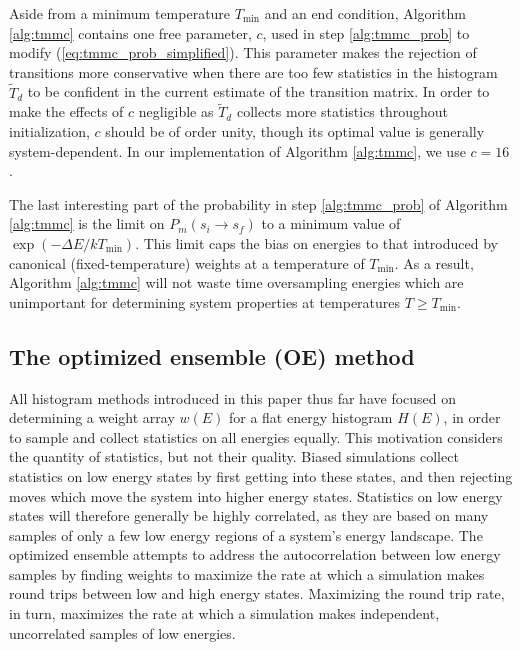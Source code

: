 \documentclass[11pt]{article}
\renewcommand{\t}{\text} %
\newcommand{\p}[1]{\left(#1\right)} %
\begin{document}
Aside from a minimum temperature $T_{\t{min}}$ and an end condition,
Algorithm \ref{alg:tmmc} contains one free parameter, $c$, used in
step \ref{alg:tmmc_prob} to modify (\ref{eq:tmmc_prob_simplified}).
This parameter makes the rejection of transitions more conservative
when there are too few statistics in the histogram $\tilde T_d$ to be
confident in the current estimate of the transition matrix. In order
to make the effects of $c$ negligible as $\tilde T_d$ collects more
statistics throughout initialization, $c$ should be of order unity,
though its optimal value is generally system-dependent. In our
implementation of Algorithm \ref{alg:tmmc}, we use $c=16$.

The last interesting part of the probability in step
\ref{alg:tmmc_prob} of Algorithm \ref{alg:tmmc} is the limit on
$P_m\p{s_i\to s_f}$ to a minimum value of $\exp\p{-\Delta
  E/kT_{\t{min}}}$. This limit caps the bias on energies to that
introduced by canonical (fixed-temperature) weights at a temperature
of $T_{\t{min}}$. As a result, Algorithm \ref{alg:tmmc} will not waste
time oversampling energies which are unimportant for determining
system properties at temperatures $T\ge T_{\t{min}}$.

\subsection{The optimized ensemble (OE) method}
\label{sec:optimized_ensemble}

All histogram methods introduced in this paper thus far have focused
on determining a weight array $w\p{E}$ for a flat energy histogram
$H\p{E}$, in order to sample and collect statistics on all energies
equally. This motivation considers the quantity of statistics, but not
their quality. Biased simulations collect statistics on low energy
states by first getting into these states, and then rejecting moves
which move the system into higher energy states. Statistics on low
energy states will therefore generally be highly correlated, as they
are based on many samples of only a few low energy regions of a
system's energy landscape. The optimized
ensemble\cite{optimized_ensemble} attempts to address the
autocorrelation between low energy samples by finding weights to
maximize the rate at which a simulation makes round trips between low
and high energy states. Maximizing the round trip rate, in turn,
maximizes the rate at which a simulation makes independent,
uncorrelated samples of low energies.
\end{document}
